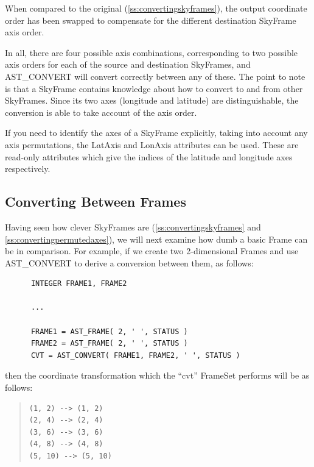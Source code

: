 \documentclass[twoside,11pt]{article}
\newcommand{\htmlref}[2]{#1}
\newcommand{\secref}[1]{\S\ref{#1}}
\renewcommand{\secref}[1]{\ref{#1}}
\begin{document}
When compared to the original (\secref{ss:convertingskyframes}), the
output coordinate order has been swapped to compensate for the
different destination SkyFrame axis order.

In all, there are four possible axis combinations, corresponding to two
possible axis orders for each of the source and destination SkyFrames,
and AST\_CONVERT will convert correctly between any of these.
The point to note is that a SkyFrame contains knowledge about how to
convert to and from other SkyFrames. Since its two axes (longitude and
latitude) are distinguishable, the conversion is able to take account
of the axis order.

If you need to identify the axes of a SkyFrame explicitly, taking into
account any axis permutations, the \htmlref{LatAxis}{LatAxis} and \htmlref{LonAxis}{LonAxis} attributes can be
used. These are read-only attributes which give the indices of the
latitude and longitude axes respectively.

\subsection{\label{ss:convertingframes}Converting Between Frames}

Having seen how clever SkyFrames are (\secref{ss:convertingskyframes}
and \secref{ss:convertingpermutedaxes}), we will next examine how dumb
a basic \htmlref{Frame}{Frame} can be in comparison. For example, if we create two
2-dimensional Frames and use \htmlref{AST\_CONVERT}{AST_CONVERT} to derive a conversion
between them, as follows:

\small
\begin{verbatim}
      INTEGER FRAME1, FRAME2

      ...

      FRAME1 = AST_FRAME( 2, ' ', STATUS )
      FRAME2 = AST_FRAME( 2, ' ', STATUS )
      CVT = AST_CONVERT( FRAME1, FRAME2, ' ', STATUS )
\end{verbatim}
\normalsize

then the coordinate transformation which the ``cvt'' \htmlref{FrameSet}{FrameSet} performs
will be as follows:

\begin{quote}
\begin{verbatim}
(1, 2) --> (1, 2)
(2, 4) --> (2, 4)
(3, 6) --> (3, 6)
(4, 8) --> (4, 8)
(5, 10) --> (5, 10)
\end{verbatim}
\end{quote}
\end{document}
